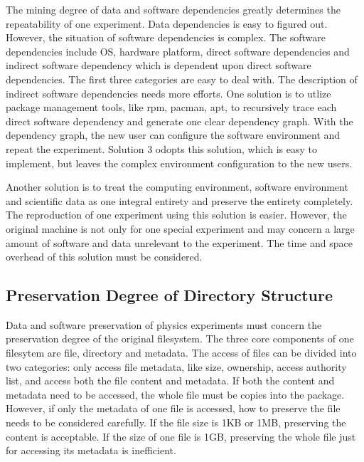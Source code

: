 \documentclass{acm_proc_article-sp}
\begin{document}
The mining degree of data and software dependencies greatly determines the
repeatability of one experiment. Data dependencies is easy to figured out. However, the situation of software dependencies is complex. The software
dependencies include OS, hardware platform, 
direct software dependencies and indirect software dependency which is dependent upon direct software dependencies.
The first
three categories are easy to deal with. The description of indirect software
dependencies needs more efforts. One solution is to utlize package management
tools, like rpm, pacman, apt, to recursively trace each direct software
dependency and generate one clear dependency graph. With the dependency graph,
the new user can configure the software environment and repeat the experiment.
Solution 3 odopts this solution, which is easy to implement, but leaves the
complex environment configuration to the new users. 

Another solution is to treat the computing environment, software environment
and scientific data as one integral entirety and preserve the entirety
completely. The reproduction of one experiment using this solution is easier.
However, the original machine is not only for one special experiment and may
concern a large amount of software and data unrelevant to the experiment. The
time and space overhead of this solution must be considered.

\subsection{Preservation Degree of Directory Structure}

Data and software preservation of physics experiments must concern the
preservation degree of the original filesystem.  The three core components of
one filesytem are file, directory and metadata.  The access of files can be
divided into two categories: only access file metadata, like size, ownership,
access authority list, and access both the file content and metadata.  If both
the content and metadata need to be accessed, the whole file must be copies
into the package.  However, if only the metadata of one file is accessed, how
to preserve the file needs to be considered carefully. If the file size
is 1KB or 1MB, preserving the content is acceptable. If the size of one file is
1GB, preserving the whole file just for accessing its metadata is
inefficient.  
\end{document}
